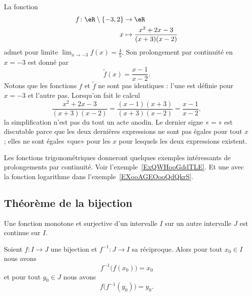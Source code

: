 \begin{example}
    La fonction
    \begin{equation}
        \begin{aligned}
            f\colon \eR\setminus\{ -3,2 \}&\to \eR \\
            x&\mapsto  \frac{ x^2+2x-3 }{ (x+3)(x-2) }
        \end{aligned}
    \end{equation}
    admet pour limite \( \lim_{x\to -3} f(x)=\frac{ 4 }{ 5 }\). Son prolongement par continuité en \( x=-3\) est donné par
    \begin{equation}
        \tilde f(x)=\frac{ x-1 }{ x-2 }.
    \end{equation}
    Notons que les fonctions \( f\) et \( \tilde f\) ne sont pas identiques : l'une est définie pour \( x=-3\) et l'autre pas. Lorsqu'on fait le calcul
    \begin{equation}
        \frac{ x^2+2x-3 }{ (x+3)(x-2) }=\frac{ (x-1)(x+3) }{ (x+3)(x-2) }=\frac{ x-1 }{ x-2 },
    \end{equation}
    la simplification n'est pas du tout un acte anodin. Le dernier signe «\( =\)» est discutable parce que les deux dernières expressions ne sont pas égales pour tout \( x\); elles ne sont égales «que» pour les \( x\) pour lesquels les deux expressions existent.
\end{example}

Les fonctions trigonométriques donneront quelques exemples intéressants de prolongements par continuité. Voir l'exemple~\ref{ExQWHooGddTLE}. Et une avec la fonction logarithme dans l'exemple~\ref{EXooAGEOooQdQkrS}.

\subsection{Théorème de la bijection}

\begin{proposition} \label{PropOARooUuCaYT}
    Une fonction monotone et surjective d'un intervalle $I$ sur un autre intervalle $J$ est continue sur $I$.
\end{proposition}

\begin{proposition}
    Soient \( f\colon I\to J\) une bijection et \( f^{-1}\colon J\to I\) sa réciproque. Alors pour tout \( x_0\in I\) nous avons
    \begin{equation}    \label{EqHQRooNmLYbF}
        f^{-1}\big( f(x_0) \big)=x_0
    \end{equation}
    et pour tout \( y_0\in J\) nous avons
    \begin{equation}    \label{EqIYTooQPvZDr}
        f\big( f^{-1}(y_0) \big)=y_0.
    \end{equation}
\end{proposition}

